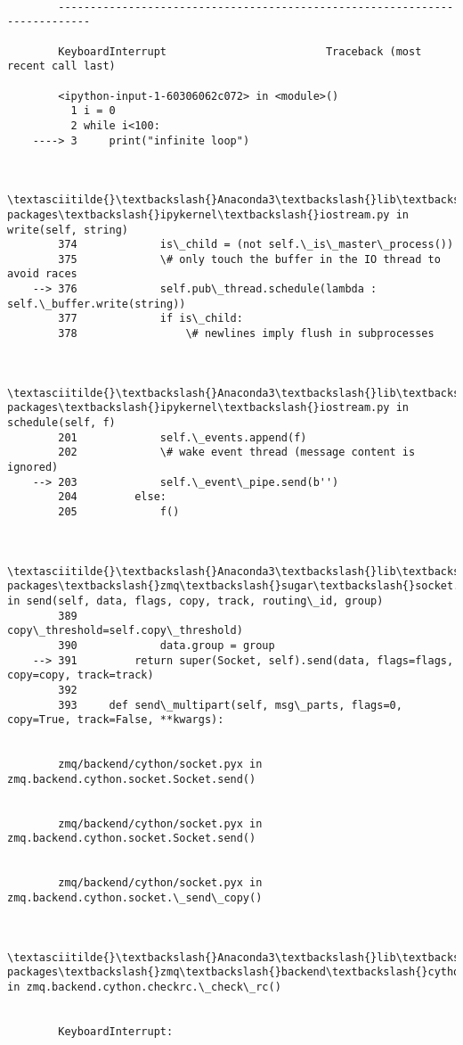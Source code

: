 \documentclass[11pt]{article}
\begin{document}
    \begin{Verbatim}[commandchars=\\\{\}]

        ---------------------------------------------------------------------------

        KeyboardInterrupt                         Traceback (most recent call last)

        <ipython-input-1-60306062c072> in <module>()
          1 i = 0
          2 while i<100:
    ----> 3     print("infinite loop")
    

        \textasciitilde{}\textbackslash{}Anaconda3\textbackslash{}lib\textbackslash{}site-packages\textbackslash{}ipykernel\textbackslash{}iostream.py in write(self, string)
        374             is\_child = (not self.\_is\_master\_process())
        375             \# only touch the buffer in the IO thread to avoid races
    --> 376             self.pub\_thread.schedule(lambda : self.\_buffer.write(string))
        377             if is\_child:
        378                 \# newlines imply flush in subprocesses
    

        \textasciitilde{}\textbackslash{}Anaconda3\textbackslash{}lib\textbackslash{}site-packages\textbackslash{}ipykernel\textbackslash{}iostream.py in schedule(self, f)
        201             self.\_events.append(f)
        202             \# wake event thread (message content is ignored)
    --> 203             self.\_event\_pipe.send(b'')
        204         else:
        205             f()
    

        \textasciitilde{}\textbackslash{}Anaconda3\textbackslash{}lib\textbackslash{}site-packages\textbackslash{}zmq\textbackslash{}sugar\textbackslash{}socket.py in send(self, data, flags, copy, track, routing\_id, group)
        389                                  copy\_threshold=self.copy\_threshold)
        390             data.group = group
    --> 391         return super(Socket, self).send(data, flags=flags, copy=copy, track=track)
        392 
        393     def send\_multipart(self, msg\_parts, flags=0, copy=True, track=False, **kwargs):
    

        zmq/backend/cython/socket.pyx in zmq.backend.cython.socket.Socket.send()
    

        zmq/backend/cython/socket.pyx in zmq.backend.cython.socket.Socket.send()
    

        zmq/backend/cython/socket.pyx in zmq.backend.cython.socket.\_send\_copy()
    

        \textasciitilde{}\textbackslash{}Anaconda3\textbackslash{}lib\textbackslash{}site-packages\textbackslash{}zmq\textbackslash{}backend\textbackslash{}cython\textbackslash{}checkrc.pxd in zmq.backend.cython.checkrc.\_check\_rc()
    

        KeyboardInterrupt: 

    \end{Verbatim}
\end{document}
